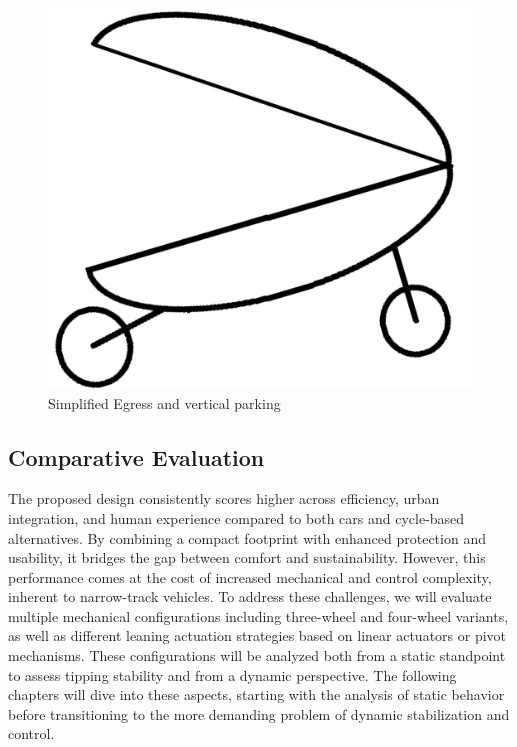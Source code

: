\newpage 

\begin{figure}[h!]
    \centering
    \includegraphics[width=0.5\linewidth]{Figures/ch4_EgressReclining.png}
    \caption{Simplified Egress and vertical parking}
    \label{fig:vertical_parking_easy_egress}
\end{figure}

\vfill


\subsection{Comparative Evaluation}
The proposed design consistently scores higher across efficiency, urban integration, and human experience compared to both cars and cycle-based alternatives. By combining a compact footprint with enhanced protection and usability, it bridges the gap between comfort and sustainability. However, this performance comes at the cost of increased mechanical and control complexity, inherent to narrow-track vehicles. To address these challenges, we will evaluate multiple mechanical configurations including three-wheel and four-wheel variants, as well as different leaning actuation strategies based on linear actuators or pivot mechanisms. These configurations will be analyzed both from a static standpoint to assess tipping stability and from a dynamic perspective. The following chapters will dive into these aspects, starting with the analysis of static behavior before transitioning to the more demanding problem of dynamic stabilization and control.

\newpage 

